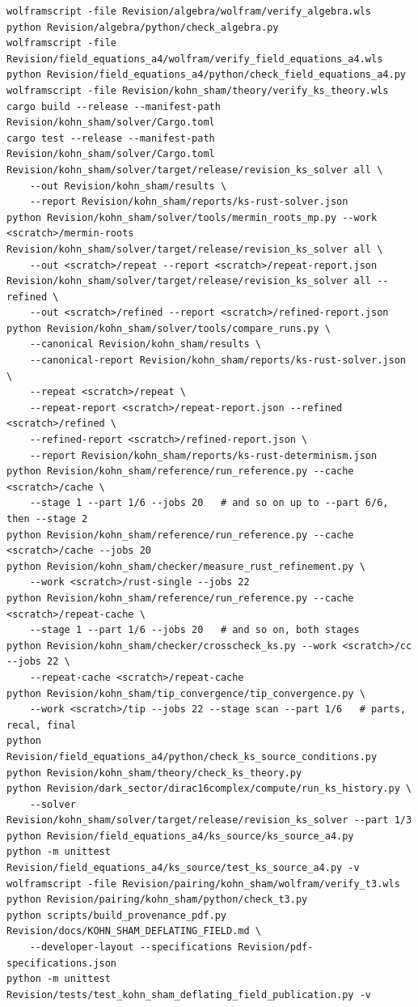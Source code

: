 \documentclass[11pt]{article}
\begin{document}
\begin{Verbatim}[fontsize=\small]
wolframscript -file Revision/algebra/wolfram/verify_algebra.wls
python Revision/algebra/python/check_algebra.py
wolframscript -file Revision/field_equations_a4/wolfram/verify_field_equations_a4.wls
python Revision/field_equations_a4/python/check_field_equations_a4.py
wolframscript -file Revision/kohn_sham/theory/verify_ks_theory.wls
cargo build --release --manifest-path Revision/kohn_sham/solver/Cargo.toml
cargo test --release --manifest-path Revision/kohn_sham/solver/Cargo.toml
Revision/kohn_sham/solver/target/release/revision_ks_solver all \
    --out Revision/kohn_sham/results \
    --report Revision/kohn_sham/reports/ks-rust-solver.json
python Revision/kohn_sham/solver/tools/mermin_roots_mp.py --work <scratch>/mermin-roots
Revision/kohn_sham/solver/target/release/revision_ks_solver all \
    --out <scratch>/repeat --report <scratch>/repeat-report.json
Revision/kohn_sham/solver/target/release/revision_ks_solver all --refined \
    --out <scratch>/refined --report <scratch>/refined-report.json
python Revision/kohn_sham/solver/tools/compare_runs.py \
    --canonical Revision/kohn_sham/results \
    --canonical-report Revision/kohn_sham/reports/ks-rust-solver.json \
    --repeat <scratch>/repeat \
    --repeat-report <scratch>/repeat-report.json --refined <scratch>/refined \
    --refined-report <scratch>/refined-report.json \
    --report Revision/kohn_sham/reports/ks-rust-determinism.json
python Revision/kohn_sham/reference/run_reference.py --cache <scratch>/cache \
    --stage 1 --part 1/6 --jobs 20   # and so on up to --part 6/6, then --stage 2
python Revision/kohn_sham/reference/run_reference.py --cache <scratch>/cache --jobs 20
python Revision/kohn_sham/checker/measure_rust_refinement.py \
    --work <scratch>/rust-single --jobs 22
python Revision/kohn_sham/reference/run_reference.py --cache <scratch>/repeat-cache \
    --stage 1 --part 1/6 --jobs 20   # and so on, both stages
python Revision/kohn_sham/checker/crosscheck_ks.py --work <scratch>/cc --jobs 22 \
    --repeat-cache <scratch>/repeat-cache
python Revision/kohn_sham/tip_convergence/tip_convergence.py \
    --work <scratch>/tip --jobs 22 --stage scan --part 1/6   # parts, recal, final
python Revision/field_equations_a4/python/check_ks_source_conditions.py
python Revision/kohn_sham/theory/check_ks_theory.py
python Revision/dark_sector/dirac16complex/compute/run_ks_history.py \
    --solver Revision/kohn_sham/solver/target/release/revision_ks_solver --part 1/3
python Revision/field_equations_a4/ks_source/ks_source_a4.py
python -m unittest Revision/field_equations_a4/ks_source/test_ks_source_a4.py -v
wolframscript -file Revision/pairing/kohn_sham/wolfram/verify_t3.wls
python Revision/pairing/kohn_sham/python/check_t3.py
python scripts/build_provenance_pdf.py Revision/docs/KOHN_SHAM_DEFLATING_FIELD.md \
    --developer-layout --specifications Revision/pdf-specifications.json
python -m unittest Revision/tests/test_kohn_sham_deflating_field_publication.py -v
\end{Verbatim}
\end{document}
